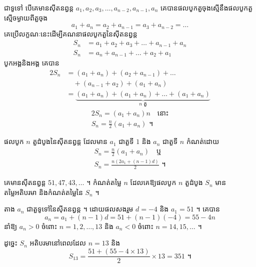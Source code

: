 ជាទូទៅ បើគេមានស៊ីតនព្វន្ត $a_1, a_2, a_3, \ldots, a_{n-2}, a_{n-1}, a_n$ គេបានផលបូកតួចុងស្មើនឹងផលបូកតួស្មើចម្ងាយពីតួចុង
\[
a_1 + a_n = a_2 + a_{n-1} = a_3 + a_{n-2} = \ldots
\]
គេប្រើលក្ខណៈនេះដើម្បីគណនាផលបូកតួនៃស៊ីតនព្វន្ត
\[
\begin{aligned}
S_n &= a_1 + a_2 + a_3 + \ldots + a_{n-1} + a_n\\
S_n &= a_n + a_{n-1} + \ldots + a_2 + a_1
\end{aligned}
\]
បូកអង្គនិងអង្គ គេបាន
\[
\begin{aligned}
2S_n &= (a_1 + a_n) + (a_2 + a_{n-1}) + \ldots\\
&\quad + (a_{n-1} + a_2) + (a_1 + a_n)\\
&= \underbrace{(a_1 + a_n) + (a_1 + a_n) + \ldots + (a_1 + a_n)}_{n \text{ តួ}}
\end{aligned}
\]
\[
\begin{gathered}
2S_n = (a_1 + a_n)n \quad \text{នោះ}\\
S_n = \frac{n}{2}(a_1 + a_n) \text{ ។}
\end{gathered}
\]

\begin{formulaBox}[ជាទូទៅ]
ផលបូក $n$ តួដំបូងនៃស៊ីតនព្វន្ត ដែលមាន $a_1$ ជាតួទី $1$ និង $a_n$ ជាតួទី $n$ កំណត់ដោយ
\[
\begin{gathered}
S_n = \frac{n}{2}(a_1 + a_n) \quad \text{ឬ}\\
S_n = \frac{n\left(2a_1 + (n - 1)d\right)}{2} \text{ ។}
\end{gathered}
\]
\end{formulaBox}

\begin{example}[លំហាត់គំរូ ១]
គេមានស៊ីតនព្វន្ត $51, 47, 43, \ldots$ ។ កំណត់តម្លៃ $n$ ដែលគេឱ្យផលបូក $n$ តួដំបូង $S_n$ មានតម្លៃអតិបរមា និងកំណត់តម្លៃនៃ $S_n$ ។
\end{example}
\ans
តាង $a_n$ ជាតួទូទៅនៃស៊ីតនព្វន្ត ។ ដោយផលសងរួម $d = -4$ និង $a_1 = 51$ ។ គេបាន
\[ a_n = a_1 + (n - 1)d = 51 + (n - 1)(-4) = 55 - 4n \]
នាំឱ្យ $a_n > 0$ ចំពោះ $n = 1, 2, \ldots, 13$ និង $a_n < 0$ ចំពោះ $n = 14, 15, \ldots$ ។

ដូច្នេះ $S_n$ អតិបរមានៅពេលដែល $n = 13$ និង
\[ S_{13} = \frac{51 + (55 - 4 \times 13)}{2} \times 13 = 351 \text{ ។} \]

